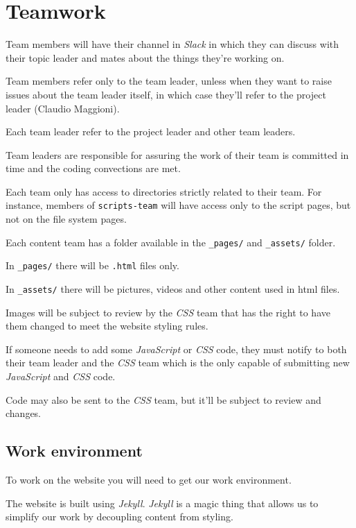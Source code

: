 \documentclass[hidelinks,12pt,a4paper,numbers=enddot]{scrartcl}
\begin{document}
\section{Teamwork}\label{teamwork}

Team members will have their channel in \emph{Slack} in which they can discuss
with their topic leader and mates about the things they're working on.

Team members refer only to the team leader, unless when they want to
raise issues about the team leader itself, in which case they'll refer to the
project leader (Claudio Maggioni).

Each team leader refer to the project leader and other team leaders.

Team leaders are responsible for assuring the work of their team is
committed in time and the coding convections are met.

Each team only has access to directories strictly related to their team.
For instance, members of \texttt{scripts-team} will have access only to
the script pages, but not on the file system pages.

Each content team has a folder available in the \texttt{\_pages/} and
\texttt{\_assets/} folder.

In \texttt{\_pages/} there will be \texttt{.html} files only.

In \texttt{\_assets/} there will be pictures, videos and other content used
in html files.

Images will be subject to review by the \emph{CSS} team that has the right to
have them changed to meet the website styling rules.

If someone needs to add some \emph{JavaScript} or \emph{CSS} code, they must notify to
both their team leader and the \emph{CSS} team which is the only capable of
submitting new \emph{JavaScript} and \emph{CSS} code.

Code may also be sent to the \emph{CSS} team, but it'll be subject to review
and changes.

\subsection{Work environment}\label{work-environment}

To work on the website you will need to get our work environment.

The website is built using \emph{Jekyll}. \emph{Jekyll} is a magic thing that
allows us to simplify our work by decoupling content from styling.
\end{document}
